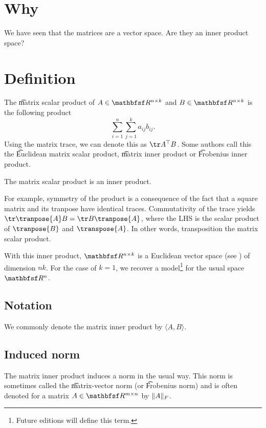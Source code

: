 

\section*{Why}

We have seen that the matrices are a vector space.
Are they an inner product space?

\section*{Definition}

The \t{matrix scalar product} of $A \in \R ^{n \times k}$ and $B \in \R ^{n \times k}$ is the following product
  \[
\sum_{i = 1}^{n} \sum_{j = 1}^{k} a_{ij}b_{ij}.
  \]
Using the matrix trace, we can denote this as $\tr A^\top  B$.
Some authors call this the \t{Euclidean matrix scalar product}, \t{matrix inner product} or \t{Frobenius inner product}.

\begin{proposition}
The matrix scalar product is an inner product.\end{proposition}

For example, symmetry of the product is a consequence of the fact that a square matrix and its tranpose have identical traces.
Commutativity of the trace yields $\tr \tranpose{A} B = \tr B\tranpose{A}$, where the LHS is the scalar product of $\tranpose{B}$ and $\transpose{A}$.
In other words, transposition  the matrix scalar product.

With this inner product, $\R ^{n \times k}$ is a Euclidean vector space (see ) of dimension $nk$.
For the case of $k = 1$, we recover a model\footnote{Future editions will define this term.}
for the usual space $\R ^n$.

\subsection*{Notation}

We commonly denote the matrix inner product by $\langle A, B \rangle$.

\subsection*{Induced norm}

The matrix inner product induces a norm in the usual way.
This norm is sometimes called the \t{matrix-vector norm} (or \t{Frobenius norm}) and is often denoted for a matrix $A \in \R ^{m \times  n}$ by $\lVert A\rVert_F$.
